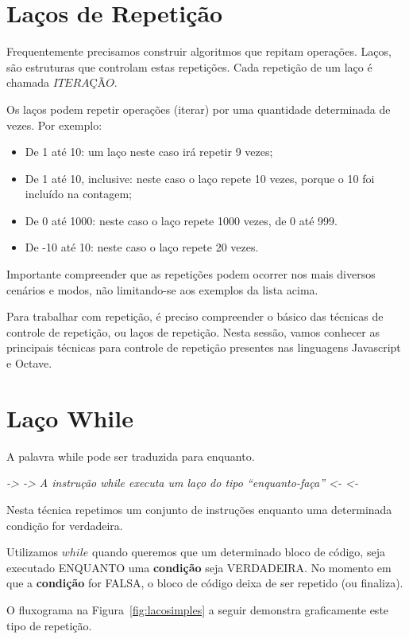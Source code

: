 \section{Laços de Repetição}
\label{lacos}

Frequentemente precisamos construir algoritmos que repitam operações. Laços, são estruturas que controlam estas repetições. Cada repetição de um laço é chamada $ITERAÇÃO$.

Os laços podem repetir operações (iterar) por uma quantidade determinada de vezes. Por exemplo:
\begin{itemize}
  \item De 1 até 10: um laço neste caso irá repetir 9 vezes;
  \item De 1 até 10, inclusive: neste caso o laço repete 10 vezes, porque o 10 foi incluído na contagem;
  \item De 0 até 1000: neste caso o laço repete 1000 vezes, de 0 até 999.
  \item De -10 até 10: neste caso o laço repete 20 vezes.
\end{itemize}

Importante compreender que as repetições podem ocorrer nos mais diversos cenários e modos, não limitando-se aos exemplos da lista acima.

Para trabalhar com repetição, é preciso compreender o básico das técnicas de controle de repetição, ou laços de repetição. Nesta sessão, vamos conhecer as principais técnicas para controle de repetição presentes nas linguagens Javascript e Octave.


\section{Laço While}
\label{sec:while}
A palavra while pode ser traduzida para enquanto.

\emph{-> -> A instrução while executa um laço do tipo “enquanto-faça”   <- <-}

Nesta técnica repetimos um conjunto de instruções enquanto uma determinada condição for verdadeira. 

Utilizamos $while$ quando queremos que um determinado bloco de código, seja executado ENQUANTO uma \textbf{condição} seja VERDADEIRA. No momento em que a \textbf{condição} for FALSA, o bloco de código deixa de ser repetido (ou finaliza).

O fluxograma na Figura~\ref{fig:lacosimples} a seguir demonstra graficamente este tipo de repetição.

